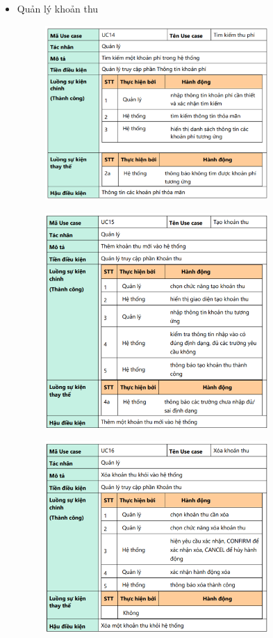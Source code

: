 \documentclass{article}
\begin{document}
\begin{itemize}
    \item Quản lý khoản thu
    \begin{figure}[H]
        \centering
        \includegraphics[width=0.8\textwidth]{Ảnh chương 2/UC14.png}
    \end{figure}
    \begin{figure}[H]
        \centering
        \includegraphics[width=0.8\textwidth]{Ảnh chương 2/UC15.png}
    \end{figure}
    \begin{figure}[H]
        \centering
        \includegraphics[width=0.8\textwidth]{Ảnh chương 2/UC16.png}

\end{figure}
\end{itemize}
\end{document}
